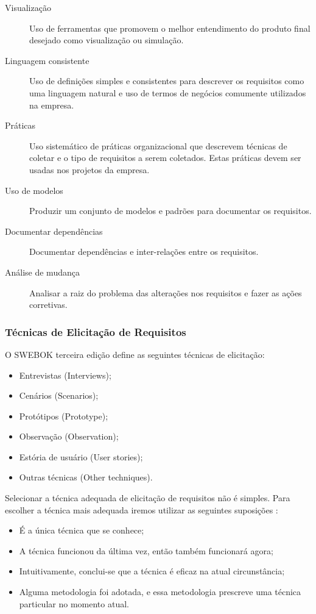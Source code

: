\begin{description}
\item [Visualização] Uso de ferramentas que promovem o melhor entendimento do produto final desejado como visualização ou simulação.
\item [Linguagem consistente] Uso de definições simples e consistentes para descrever os requisitos como uma linguagem natural e uso de termos de negócios comumente utilizados na empresa.

\item [Práticas] Uso sistemático de práticas organizacional que descrevem técnicas de coletar e o tipo de requisitos a serem coletados. Estas práticas devem ser usadas nos projetos da empresa.
\item [Uso de modelos] Produzir um conjunto de modelos e padrões para documentar os requisitos. 
\item [Documentar dependências] Documentar dependências e inter-relações entre os requisitos.
\item [Análise de mudança] Analisar a raiz do problema das alterações nos requisitos e fazer as ações corretivas.
\end{description}

\subsubsection{Técnicas de Elicitação de Requisitos}

O SWEBOK terceira edição \cite{IEEEComputerSociety:2014:GSE:2616205} define as seguintes técnicas de elicitação:

\begin{itemize}
\item Entrevistas (Interviews);
\item Cenários (Scenarios);
\item Protótipos (Prototype);
\item Observação (Observation);
\item Estória de usuário (User stories);
\item Outras técnicas (Other techniques).
\end{itemize}

Selecionar a técnica adequada de elicitação de requisitos não é simples. Para escolher a técnica mais adequada iremos utilizar as seguintes suposições \cite{atil:2012}:

\begin{itemize}
\item É a única técnica que se conhece;
\item A técnica funcionou da última vez, então também funcionará agora;
\item Intuitivamente, conclui-se que a técnica é eficaz na atual circunstância;
\item Alguma metodologia foi adotada, e essa metodologia prescreve uma técnica particular no momento atual.
\end{itemize}


